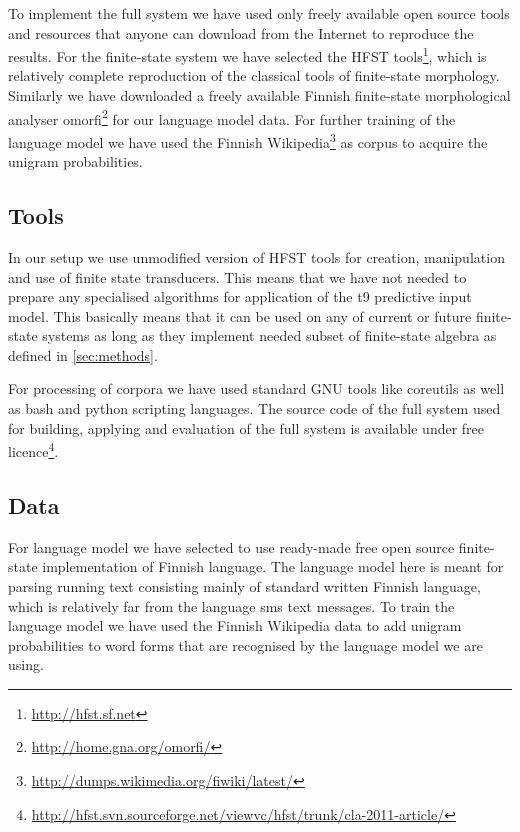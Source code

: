 \documentclass[a4paper,conference]{IEEEtran}
\begin{document}
To implement the full system we have used only freely available open source
tools and resources that anyone can download from the Internet to reproduce the
results. For the finite-state system we have selected the HFST
tools\footnote{\url{http://hfst.sf.net}}, which is relatively complete
reproduction of the classical tools of finite-state
morphology\cite{beesley/2003}. Similarly we have downloaded a freely available
Finnish finite-state morphological analyser
omorfi\footnote{\url{http://home.gna.org/omorfi/}} for our language model
data\cite{pirinen/2011/nodalida}. For further training of the language model we
have used the Finnish
Wikipedia\footnote{\url{http://dumps.wikimedia.org/fiwiki/latest/}} as corpus
to acquire the unigram probabilities\cite{pirinen/2010/lrec}.

\subsection{Tools}

In our setup we use unmodified version of HFST tools for creation, manipulation
and use of finite state transducers\cite{hfst/2011}. This means that we have
not needed to prepare any specialised algorithms for application of the t9
predictive input model. This basically means that it can be used on any of
current or future finite-state systems as long as they implement needed subset
of finite-state algebra as defined in \ref{sec:methods}.

For processing of corpora we have used standard GNU tools like coreutils as
well as bash and python scripting languages. The source code of the full system
used for building, applying and evaluation of the full system is available
under free
licence\footnote{\url{http://hfst.svn.sourceforge.net/viewvc/hfst/trunk/cla-2011-article/}}.

\subsection{Data}
\label{sec:data}

For language model we have selected to use ready-made free open source
finite-state implementation of Finnish language\cite{pirinen/2011/nodalida}.
The language model here is meant for parsing running text consisting mainly of
standard written Finnish language, which is relatively far from the language
sms text messages.  To train the language model we have used
the Finnish Wikipedia data to add unigram probabilities to word forms that are
recognised by the language model we are using. 
\end{document}
